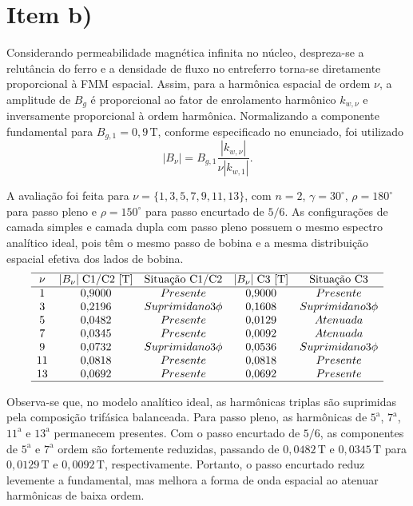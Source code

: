 \section{Item b)}

Considerando permeabilidade magnética infinita no núcleo, despreza-se a relutância do ferro e a densidade de fluxo no entreferro torna-se diretamente proporcional à FMM espacial. Assim, para a harmônica espacial de ordem \(\nu\), a amplitude de \(B_g\) é proporcional ao fator de enrolamento harmônico \(k_{w,\nu}\) e inversamente proporcional à ordem harmônica. Normalizando a componente fundamental para \(B_{g,1}=0{,}9\,\mathrm{T}\), conforme especificado no enunciado, foi utilizado
\[
|B_\nu|
=
B_{g,1}
\frac{|k_{w,\nu}|}{\nu |k_{w,1}|}.
\]

A avaliação foi feita para \(\nu=\{1,3,5,7,9,11,13\}\), com \(n=2\), \(\gamma=30^\circ\), \(\rho=180^\circ\) para passo pleno e \(\rho=150^\circ\) para passo encurtado de \(5/6\). As configurações de camada simples e camada dupla com passo pleno possuem o mesmo espectro analítico ideal, pois têm o mesmo passo de bobina e a mesma distribuição espacial efetiva dos lados de bobina.
\[
\begin{array}{c c c c c}
    \hline
    \nu &
    |B_{\nu}|\;\text{C1/C2 [T]} &
    \text{Situação C1/C2} &
    |B_{\nu}|\;\text{C3 [T]} &
    \text{Situação C3} \\
    \hline
    1  & 0{,}9000 & Presente            & 0{,}9000 & Presente \\
    3  & 0{,}2196 & Suprimida no 3\phi  & 0{,}1608 & Suprimida no 3\phi \\
    5  & 0{,}0482 & Presente            & 0{,}0129 & Atenuada \\
    7  & 0{,}0345 & Presente            & 0{,}0092 & Atenuada \\
    9  & 0{,}0732 & Suprimida no 3\phi  & 0{,}0536 & Suprimida no 3\phi \\
    11 & 0{,}0818 & Presente            & 0{,}0818 & Presente \\
    13 & 0{,}0692 & Presente            & 0{,}0692 & Presente \\
    \hline
\end{array}
\]

Observa-se que, no modelo analítico ideal, as harmônicas triplas são suprimidas pela composição trifásica balanceada. Para passo pleno, as harmônicas de \(5^\mathrm{a}\), \(7^\mathrm{a}\), \(11^\mathrm{a}\) e \(13^\mathrm{a}\) permanecem presentes. Com o passo encurtado de \(5/6\), as componentes de \(5^\mathrm{a}\) e \(7^\mathrm{a}\) ordem são fortemente reduzidas, passando de \(0{,}0482\,\mathrm{T}\) e \(0{,}0345\,\mathrm{T}\) para \(0{,}0129\,\mathrm{T}\) e \(0{,}0092\,\mathrm{T}\), respectivamente. Portanto, o passo encurtado reduz levemente a fundamental, mas melhora a forma de onda espacial ao atenuar harmônicas de baixa ordem.
